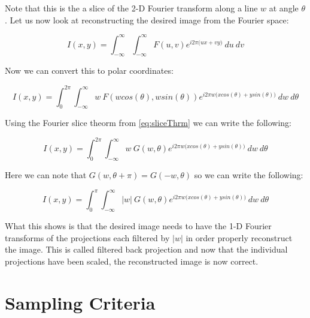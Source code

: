 \noindent
 Note that this is the a slice of the 2-D Fourier transform along a line $w$ at angle $\theta$. Let us now look at reconstructing the desired image from the Fourier space:

\begin{equation}
I(x,y) = \int_{-\infty}^{\infty} \int_{-\infty}^{\infty} F(u,v)   e^{i2\pi \big(ux + vy \big)} \: du \: dv 
\end{equation}

\noindent 
Now we can convert this to polar coordinates:

\begin{equation}
I(x,y) = \int_{0}^{2\pi} \int_{-\infty}^{\infty} w \: F(wcos(\theta),wsin(\theta))   e^{i2\pi w\big(xcos(\theta) + ysin(\theta) \big)} \:  dw \: d\theta
\end{equation}

\noindent
Using the Fourier slice theorm from \ref{eq:sliceThrm} we can write the following:

\begin{equation}
I(x,y) = \int_{0}^{2\pi} \int_{-\infty}^{\infty} w\:  G(w,\theta)  e^{i2\pi w\big(xcos(\theta) + ysin(\theta) \big)} \:  dw \: d\theta
\end{equation}

\noindent
Here we can note that $G(w,\theta + \pi) = G(-w,\theta)$ so we can write the following:

\begin{equation}
I(x,y) = \int_{0}^{\pi} \int_{-\infty}^{\infty} |w|\: G(w,\theta)  e^{i2\pi w\big(xcos(\theta) + ysin(\theta) \big)} \:  dw \: d\theta
\end{equation}

What this shows is that the desired image needs to have the 1-D Fourier transforms of the projections each filtered by $|w|$ in order properly reconstruct the image. This is called filtered back projection and now that the individual projections have been scaled, the reconstructed image is now correct. 

\section{Sampling Criteria}

